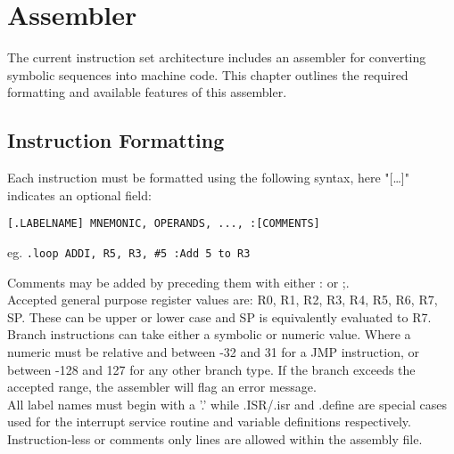 
\section{Assembler}
The current instruction set architecture includes an assembler for converting symbolic sequences into machine code. This chapter outlines the required formatting and available features of this assembler. 

\subsection{Instruction Formatting}
Each instruction must be formatted using the following syntax, here "[\dots]" indicates an optional field:

\begin{center}\texttt{[.LABELNAME] MNEMONIC, OPERANDS, ..., :[COMMENTS]}\end{center}

\begin{center}eg. \texttt{.loop ADDI, R5, R3, \#5 :Add 5 to R3}
\end{center}

\noindent Comments may be added by preceding them with either : or ;.\\

\noindent Accepted general purpose register values are: R0, R1, R2, R3, R4, R5, R6, R7, SP. These can be upper or lower case and SP is equivalently evaluated to R7.\\

\noindent Branch instructions can take either a symbolic or numeric value. 
Where a numeric must be relative and between -32 and 31 for a JMP instruction, or between -128 and 127 for any other branch type. 
If the branch exceeds the accepted range, the assembler will flag an error message. \\

\noindent All label names must begin with a '.' while .ISR/.isr and .define are special cases used for the interrupt service routine and variable definitions respectively. \\

\noindent Instruction-less or comments only lines are allowed within the assembly file. \\
\newpage
{}


